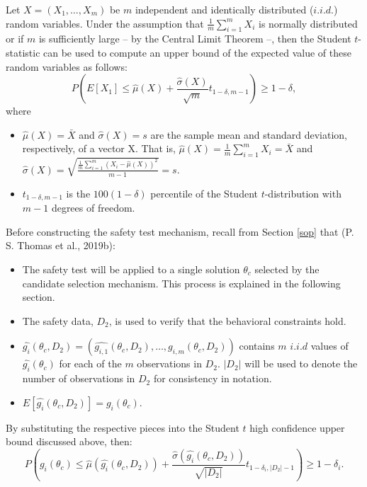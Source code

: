 \documentclass[12pt, twoside]{amherstthesis}
\begin{document}
Let \(X = (X_1, \ldots, X_m)\) be \(m\) independent and identically distributed (\(i.i.d.\)) random variables. Under the assumption that \(\frac{1}{m} \sum_{i=1}^m X_i\) is normally distributed or if \(m\) is sufficiently large -- by the Central Limit Theorem --, then the Student \(t\)-statistic can be used to compute an upper bound of the expected value of these random variables as follows:
\begin{equation}
\label{ch2eq10}
P(E[X_1] \leq \hat{\mu}(X) + \frac{\hat{\sigma}(X)}{\sqrt{m}}t_{1-\delta, m-1}) \geq 1 - \delta,
\end{equation}
where
\begin{itemize}
\item
  \(\hat{\mu}(X) = \bar{X}\) and \(\hat{\sigma}(X) = s\) are the sample mean and standard deviation, respectively, of a vector X. That is, \(\hat{\mu}(X) = \frac{1}{m}\sum_{i=1}^m X_i = \bar{X}\) and \(\hat{\sigma}(X) = \sqrt{\frac{\frac{1}{m}\sum_{i=1}^m (X_i - \hat{\mu}(X))^2}{m-1}} = s\).
\item
  \(t_{1-\delta, m-1}\) is the \(100(1-\delta)\) percentile of the Student \(t\)-distribution with \(m-1\) degrees of freedom.
\end{itemize}
Before constructing the safety test mechanism, recall from Section \ref{sop} that (P. S. Thomas et al., 2019b):
\begin{itemize}
\item
  The safety test will be applied to a single solution \(\theta_c\) selected by the candidate selection mechanism. This process is explained in the following section.
\item
  The safety data, \(D_2\), is used to verify that the behavioral constraints hold.
\item
  \(\hat{g_i}(\theta_c, D_2) = (\hat{g_{i,1}}(\theta_c, D_2), \ldots,\hat{g_{i,m}}(\theta_c, D_2))\) contains \(m\) \(i.i.d\) values of \(\hat{g_i}(\theta_c)\) for each of the \(m\) observations in \(D_2\). \(|D_2|\) will be used to denote the number of observations in \(D_2\) for consistency in notation.
\item
  \(E[\hat{g_i}(\theta_c, D_2)] = g_i(\theta_c)\).
\end{itemize}
By substituting the respective pieces into the Student \(t\) high confidence upper bound discussed above, then:
\begin{equation}
\label{ch2eq11}
P(g_i(\theta_c) \leq \hat{\mu}(\hat{g_i}(\theta_c, D_2)) + \frac{\hat{\sigma}(\hat{g_i}(\theta_c, D_2))}{\sqrt{|D_2|}}t_{1-\delta_i, |D_2|-1}) \geq 1 - \delta_i.
\end{equation}
\end{document}
